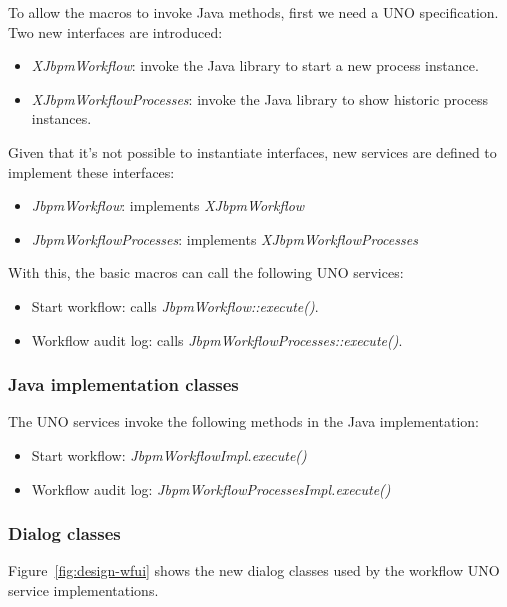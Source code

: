 To allow the macros to invoke Java methods, first we need a UNO specification.
Two new interfaces are introduced:

\begin{itemize}
\item \emph{XJbpmWorkflow}: invoke the Java library to start a new process instance.
\item \emph{XJbpmWorkflowProcesses}: invoke the Java library to show historic process instances.
\end{itemize}

Given that it's not possible to instantiate interfaces, new services are
defined to implement these interfaces:

\begin{itemize}
\item \emph{JbpmWorkflow}: implements \emph{XJbpmWorkflow}
\item \emph{JbpmWorkflowProcesses}: implements \emph{XJbpmWorkflowProcesses}
\end{itemize}

With this, the basic macros can call the following UNO services:

\begin{itemize}
\item Start workflow: calls \emph{JbpmWorkflow::execute()}.
\item Workflow audit log: calls \emph{JbpmWorkflowProcesses::execute()}.
\end{itemize}

\subsubsection*{Java implementation classes}

The UNO services invoke the following methods in the Java implementation:

\begin{itemize}
\item Start workflow: \emph{JbpmWorkflowImpl.execute()}
\item Workflow audit log: \emph{JbpmWorkflowProcessesImpl.execute()}
\end{itemize}

\subsubsection*{Dialog classes}

Figure~\ref{fig:design-wfui} shows the new dialog classes used by the workflow
UNO service implementations.

